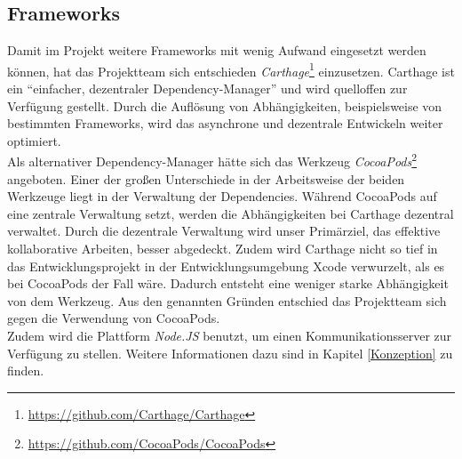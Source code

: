 \subsection{Frameworks}
Damit im Projekt weitere Frameworks mit wenig Aufwand eingesetzt werden können, hat das Projektteam sich entschieden \emph{Carthage}\footnote{\url{https://github.com/Carthage/Carthage}} einzusetzen. Carthage ist ein \enquote{einfacher, dezentraler Dependency-Manager} und wird quelloffen zur Verfügung gestellt. Durch die Auflösung von Abhängigkeiten, beispielsweise von bestimmten Frameworks, wird das asynchrone und dezentrale Entwickeln weiter optimiert. \\
Als alternativer Dependency-Manager hätte sich das Werkzeug \emph{CocoaPods}\footnote{\url{https://github.com/CocoaPods/CocoaPods}} angeboten. Einer der großen Unterschiede in der Arbeitsweise der beiden Werkzeuge liegt in der Verwaltung der Dependencies. Während CocoaPods auf eine zentrale Verwaltung setzt, werden die Abhängigkeiten bei Carthage dezentral verwaltet. Durch die dezentrale Verwaltung wird unser Primärziel, das effektive kollaborative Arbeiten, besser abgedeckt. Zudem wird Carthage nicht so tief in das Entwicklungsprojekt in der Entwicklungsumgebung Xcode verwurzelt, als es bei CocoaPods der Fall wäre. Dadurch entsteht eine weniger starke Abhängigkeit von dem Werkzeug. Aus den genannten Gründen entschied das Projektteam sich gegen die Verwendung von CocoaPods. \\
Zudem wird die Plattform \emph{Node.JS} benutzt, um einen Kommunikationsserver zur Verfügung zu stellen. Weitere Informationen dazu sind in Kapitel \ref{Konzeption} zu finden. 










